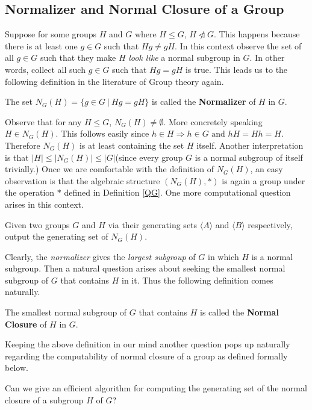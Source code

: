\subsection{Normalizer and Normal Closure of a Group}
Suppose for some groups $H$ and $G$ where $H\leq G$, $H\ntriangleleft G$. This happens because there is at least one $g\in G$ such that $Hg\neq gH$. In this context observe the set of all $g\in G$ such that they make $H$ \emph{look like} a normal subgroup in $G$. In other words, collect all such $g\in G$ such that $Hg = gH$ is true. This leads us to the following definition in the literature of Group theory again.
\begin{definition}\label{normalizer}
	The set $N_G(H) = \{g\in G~|~Hg = gH\}$ is called the {\bf Normalizer} of $H$ in $G$.
\end{definition}
Observe that for any $H\leq G$, $N_G(H) \neq \emptyset$. More concretely speaking $H\in N_G(H)$. This follows easily since $h\in H\Longrightarrow h\in G\text{ and }hH = Hh = H$. Therefore $N_G(H)$ is at least containing the set $H$ itself. Another interpretation is that $|H|\leq |N_G(H)| \leq |G|$(since every group $G$ is a normal subgroup of itself trivially.) Once we are comfortable with the definition of $N_G(H)$, an easy observation is that the algebraic structure $(N_G(H),*)$ is again a group under the operation $*$ defined in Definition \ref{QG}. One more computational question arises in this context.
\begin{problem}\label{3}
	Given two groups $G$ and $H$ via their generating sets $\langle A\rangle$ and $\langle B\rangle$ respectively, output the generating set of $N_G(H)$.
\end{problem}
Clearly, the \emph{normalizer} gives the \emph{largest subgroup} of $G$ in which $H$ is a normal subgroup. Then a natural question arises about seeking the smallest normal subgroup of $G$ that contains $H$ in it. Thus the following definition comes naturally.
\begin{definition}
	The smallest normal subgroup of $G$ that contains $H$ is called the {\bf Normal Closure} of $H$ in $G$.
\end{definition}
Keeping the above definition in our mind another question pops up naturally regarding the computability of normal closure of a group as defined formally below.
\begin{problem}\label{3}
	Can we give an efficient algorithm for computing the generating set of the normal closure of a subgroup $H$ of $G$? 
\end{problem}

